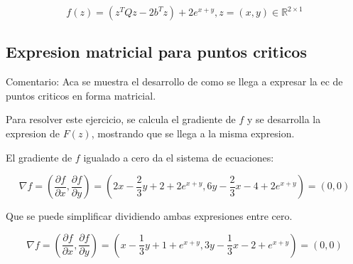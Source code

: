 \documentclass{article}
\begin{document}
    \begin{equation}
        f(z) = (z^{T}Qz - 2b^{T}z) + 2e^{x+y}, z = (x,y) \in \mathbb{R}^{2\times1}
    \end{equation}

    \subsection{Expresion matricial para puntos criticos}
    Comentario: Aca se muestra el desarrollo de como se llega a expresar la ec de puntos criticos en forma matricial.
    
    Para resolver este ejercicio, se calcula el gradiente de $f$ y se desarrolla la expresion de $F(z)$, mostrando que se
    llega a la misma expresion.

    El gradiente de $f$ igualado a cero da el sistema de ecuaciones:
    
    \begin{equation}
        \nabla f = \left( \frac{\partial f}{\partial x}, \frac{\partial f}{\partial y} \right)
        =
        \left( 2x - \frac{2}{3}y + 2 + 2e^{x+y}, 6y - \frac{2}{3}x - 4 + 2e^{x+y} \right) = (0,0)
    \end{equation}

    Que se puede simplificar dividiendo ambas expresiones entre cero.
    
    \begin{equation}
        \nabla f = \left( \frac{\partial f}{\partial x}, \frac{\partial f}{\partial y} \right)
        =
        \left( x - \frac{1}{3}y + 1 + e^{x+y}, 3y - \frac{1}{3}x - 2 + e^{x+y} \right) = (0,0)
    \end{equation}
\end{document}
